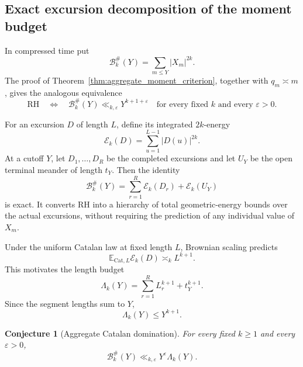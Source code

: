 \documentclass[11pt]{amsart}
\numberwithin{equation}{section}
\theoremstyle{plain}
\newtheorem{conjecture}[theorem]{Conjecture}
\theoremstyle{definition}
\theoremstyle{remark}
\newcommand{\E}{\mathbb{E}}
\newcommand{\eps}{\varepsilon}
\begin{document}
\subsection{Exact excursion decomposition of the moment budget}

In compressed time put
\begin{equation}
\mathcal B_k^{\#}(Y)=\sum_{m\leq Y}|X_m|^{2k}.
\label{eq:compressed_time_moment}
\end{equation}
The proof of Theorem~\ref{thm:aggregate_moment_criterion}, together with
$q_m\asymp m$, gives the analogous equivalence
\begin{equation}
\mathrm{RH}
\quad\Longleftrightarrow\quad
\mathcal B_k^{\#}(Y)\ll_{k,\eps}Y^{k+1+\eps}
\quad\text{for every fixed $k$ and every $\eps>0$}.
\label{eq:compressed_moment_equivalence}
\end{equation}

For an excursion $D$ of length $L$, define its integrated $2k$-energy
\begin{equation}
\mathcal E_k(D)=\sum_{u=1}^{L-1}|D(u)|^{2k}.
\label{eq:excursion_integrated_energy}
\end{equation}
At a cutoff $Y$, let $D_1,\ldots,D_R$ be the completed excursions and let
$U_Y$ be the open terminal meander of length $t_Y$.  Then the identity
\begin{equation}
\boxed{
\mathcal B_k^{\#}(Y)
=
\sum_{r=1}^{R}\mathcal E_k(D_r)
+\mathcal E_k(U_Y)
}
\label{eq:exact_excursion_moment_decomposition}
\end{equation}
is exact.  It converts RH into a hierarchy of total geometric-energy bounds
over the actual excursions, without requiring the prediction of any
individual value of $X_m$.

Under the uniform Catalan law at fixed length $L$, Brownian scaling predicts
\begin{equation}
\E_{\mathrm{Cat},L}\mathcal E_k(D)
\asymp_k L^{k+1}.
\label{eq:catalan_integrated_moment_scale}
\end{equation}
This motivates the length budget
\begin{equation}
\Lambda_k(Y)
=
\sum_{r=1}^{R}L_r^{k+1}+t_Y^{k+1}.
\label{eq:length_moment_budget}
\end{equation}
Since the segment lengths sum to $Y$,
\begin{equation}
\Lambda_k(Y)\leq Y^{k+1}.
\label{eq:length_budget_convexity}
\end{equation}

\begin{conjecture}[Aggregate Catalan domination]
\label{conj:aggregate_catalan_domination}
For every fixed $k\geq1$ and every $\eps>0$,
\begin{equation}
\mathcal B_k^{\#}(Y)
\ll_{k,\eps}
Y^{\eps}\Lambda_k(Y).
\label{eq:aggregate_catalan_domination}
\end{equation}
\end{conjecture}
\end{document}
